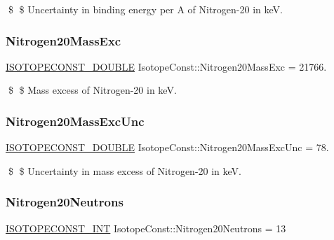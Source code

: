 \$ \$ Uncertainty in binding energy per A of Nitrogen-\/20 in keV. \mbox{\label{group___isotope_const-_nitrogen-_n20_ga0ee43d57390b3aa609b31ac70e9b5c5f}} 
\subsubsection{\texorpdfstring{Nitrogen20\+Mass\+Exc}{Nitrogen20MassExc}}
{\footnotesize\ttfamily \mbox{\hyperlink{group___isotope_const-_macros_ga8f45a7272ce02c0b4c65c44636ed719a}{I\+S\+O\+T\+O\+P\+E\+C\+O\+N\+S\+T\+\_\+\+D\+O\+U\+B\+LE}} Isotope\+Const\+::\+Nitrogen20\+Mass\+Exc = 21766.}

\$ \$ Mass excess of Nitrogen-\/20 in keV. \mbox{\label{group___isotope_const-_nitrogen-_n20_ga675075c0e1d1075c131cbedbb36c3c18}} 
\subsubsection{\texorpdfstring{Nitrogen20\+Mass\+Exc\+Unc}{Nitrogen20MassExcUnc}}
{\footnotesize\ttfamily \mbox{\hyperlink{group___isotope_const-_macros_ga8f45a7272ce02c0b4c65c44636ed719a}{I\+S\+O\+T\+O\+P\+E\+C\+O\+N\+S\+T\+\_\+\+D\+O\+U\+B\+LE}} Isotope\+Const\+::\+Nitrogen20\+Mass\+Exc\+Unc = 78.}

\$ \$ Uncertainty in mass excess of Nitrogen-\/20 in keV. \mbox{\label{group___isotope_const-_nitrogen-_n20_ga261aaafe98cca7cd299652eccf06fb32}} 
\subsubsection{\texorpdfstring{Nitrogen20\+Neutrons}{Nitrogen20Neutrons}}
{\footnotesize\ttfamily \mbox{\hyperlink{group___isotope_const-_macros_ga5f18360b3e99483a35c32d789e62621c}{I\+S\+O\+T\+O\+P\+E\+C\+O\+N\+S\+T\+\_\+\+I\+NT}} Isotope\+Const\+::\+Nitrogen20\+Neutrons = 13}

